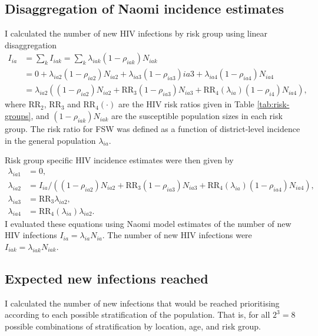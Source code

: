 \documentclass[a4paper, nobind]{templates/ociamthesis}
\begin{document}
\hypertarget{disaggregation-of-naomi-incidence-estimates}{%
\subsection{Disaggregation of Naomi incidence estimates}\label{disaggregation-of-naomi-incidence-estimates}}

I calculated the number of new HIV infections by risk group using linear disaggregation
\begin{align}
    I_{ia} &= \sum_k I_{iak} = \sum_k \lambda_{iak} (1 - \rho_{iak}) N_{iak} \\
    &= 0 + \lambda_{ia2} (1 - \rho_{ia2}) N_{ia2} + \lambda_{ia3} (1 - \rho_{ia3}) {ia3} + \lambda_{ia4} (1 - \rho_{ia4}) N_{ia4} \\
    &= \lambda_{ia2} \left((1 - \rho_{ia2}) N_{ia2}  + \text{RR}_{3} (1 - \rho_{ia3}) N_{ia3} + \text{RR}_4(\lambda_{ia}) (1 - \rho_{i4}) N_{ia4}  \right),
\end{align}
where \(\text{RR}_{2}\), \(\text{RR}_{3}\) and \(\text{RR}_{4}(\cdot)\) are the HIV risk ratios given in Table \ref{tab:risk-groups}, and \((1 - \rho_{iak}) N_{iak}\) are the susceptible population sizes in each risk group.
The risk ratio for FSW was defined as a function of district-level incidence in the general population \(\lambda_{ia}\).

Risk group specific HIV incidence estimates were then given by
\begin{align}
    \lambda_{ia1} &= 0, \\
    \lambda_{ia2} &= I_{ia} / \left((1 - \rho_{ia2}) N_{ia2} + \text{RR}_{3} (1 - \rho_{ia3}) N_{ia3} + \text{RR}_4(\lambda_{ia}) (1 - \rho_{ia4}) N_{ia4}\right), \\
    \lambda_{ia3} &= \text{RR}_{3} \lambda_{ia2}, \\
    \lambda_{ia4} &= \text{RR}_4(\lambda_{ia}) \lambda_{ia2}.
\end{align}
I evaluated these equations using Naomi model estimates of the number of new HIV infections \(I_{ia} = \lambda_{ia} N_{ia}\).
The number of new HIV infections were \(I_{iak} = \lambda_{iak} N_{iak}\).

\hypertarget{expected-new-infections-reached}{%
\subsection{Expected new infections reached}\label{expected-new-infections-reached}}

I calculated the number of new infections that would be reached prioritising according to each possible stratification of the population.
That is, for all \(2^3 = 8\) possible combinations of stratification by location, age, and risk group.
\end{document}
